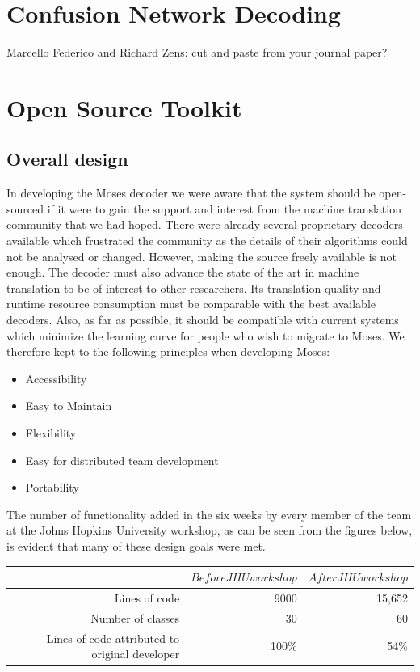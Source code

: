 \documentclass[11pt]{book}
\theoremstyle{plain}
\begin{document}
\chapter{Confusion Network Decoding}
{\sc Marcello Federico and Richard Zens: cut and paste from your journal paper?}

\chapter{Open Source Toolkit}
\section{Overall design}
In developing the Moses decoder we were aware that the system should be open-sourced if it were to gain the support and interest from the machine translation community that we had hoped. There were already several proprietary decoders available which frustrated the community as the details of their algorithms could not be analysed or changed.
However, making the source freely available is not enough. The decoder must also advance the state of the art in machine translation to be of interest to other researchers. Its translation quality and runtime resource consumption must be comparable with the best available decoders. Also, as far as possible, it should be compatible with current systems which minimize the learning curve for people who wish to migrate to Moses. 
We therefore kept to the following principles when developing Moses: \\
\begin{itemize}	
 \item Accessibility 
 \item 	Easy to Maintain
 \item	Flexibility
 \item	Easy for distributed team development
 \item	Portability
\end{itemize}
The number of functionality added in the six weeks by every member of the team at the Johns Hopkins University workshop, as can be seen from the figures below, is evident that many of these design goals were met.

\begin{tabular}{|r|r|r|}
\hline
$ $&$ Before JHU workshop $&$ After JHU workshop $\\
\hline
Lines of code	& 9000	& 15,652\\
Number of classes	& 30	& 60\\
Lines of code attributed to original developer	& 100\%	& 54\%\\
\hline
\end{tabular}
\end{document}
